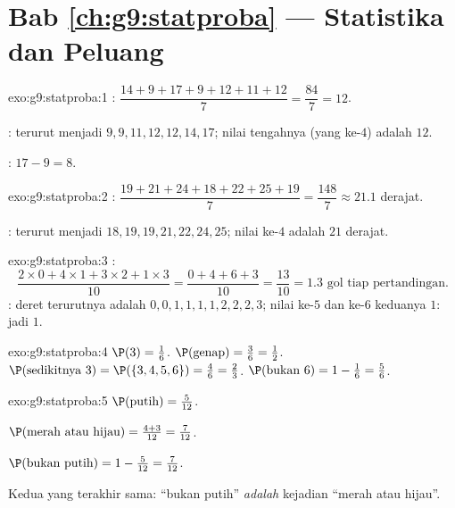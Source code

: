 \section*{Bab \ref{ch:g9:statproba} --- Statistika dan Peluang}

\begin{solution}{exo:g9:statproba:1}
: $\dfrac{14 + 9 + 17 + 9 + 12 + 11 + 12}{7} = \dfrac{84}{7} = 12$.

: terurut menjadi $9, 9, 11, 12, 12, 14, 17$; nilai tengahnya
(yang ke-$4$) adalah $12$.

: $17 - 9 = 8$.
\end{solution}

\begin{solution}{exo:g9:statproba:2}
: $\dfrac{19 + 21 + 24 + 18 + 22 + 25 + 19}{7} = \dfrac{148}{7}
\approx 21.1$ derajat.

: terurut menjadi $18, 19, 19, 21, 22, 24, 25$; nilai ke-$4$
adalah $21$ derajat.
\end{solution}

\begin{solution}{exo:g9:statproba:3}
:
\[
\frac{2 \times 0 + 4 \times 1 + 3 \times 2 + 1 \times 3}{10}
= \frac{0 + 4 + 6 + 3}{10} = \frac{13}{10} = 1.3
\text{ gol tiap pertandingan.}
\]
: deret terurutnya adalah $0,0,1,1,1,1,2,2,2,3$; nilai ke-$5$ dan
ke-$6$ keduanya $1$: jadi  $1$.
\end{solution}

\begin{solution}{exo:g9:statproba:4}
$\P(3) = \frac16$. \quad
$\P(\text{genap}) = \frac36 = \frac12$. \quad
$\P(\text{sedikitnya } 3) = \P(\{3,4,5,6\}) = \frac46 = \frac23$. \quad
$\P(\text{bukan } 6) = 1 - \frac16 = \frac56$.
\end{solution}

\begin{solution}{exo:g9:statproba:5}
$\P(\text{putih}) = \frac{5}{12}$.

$\P(\text{merah atau hijau}) = \frac{4 + 3}{12} = \frac{7}{12}$.

$\P(\text{bukan putih}) = 1 - \frac{5}{12} = \frac{7}{12}$.

Kedua yang terakhir sama: ``bukan putih'' \emph{adalah} kejadian
``merah atau hijau''.
\end{solution}

